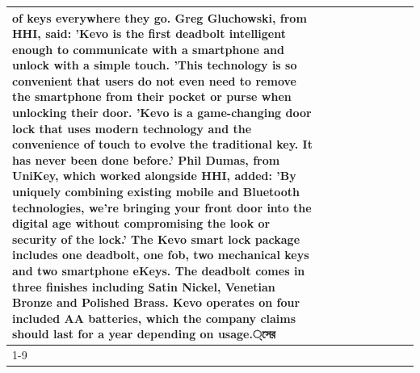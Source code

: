 \begin{table}[H]
\begin{tabular}{lllrlllll}
of keys everywhere they go. Greg Gluchowski, from HHI, said: 'Kevo is the first deadbolt intelligent enough to communicate with a smartphone and unlock with a simple touch. 'This technology is so convenient that users do not even need to remove the smartphone from their pocket or purse when unlocking their door. 'Kevo is a game-changing door lock that uses modern technology and the convenience of touch to evolve the traditional key. It has never been done before.' Phil Dumas, from UniKey, which worked alongside HHI, added: 'By uniquely combining existing mobile and Bluetooth technologies, we’re bringing your front door into the digital age without compromising the look or security of the lock.' The Kevo smart lock package includes one deadbolt, one fob, two mechanical keys and two smartphone eKeys. The deadbolt comes in three finishes including Satin Nickel, Venetian Bronze and Polished Brass. Kevo operates on four included AA batteries, which the company claims should last for a year depending on usage.্সের \\
\cline{1-9}

\end{tabular}
\end{table}
